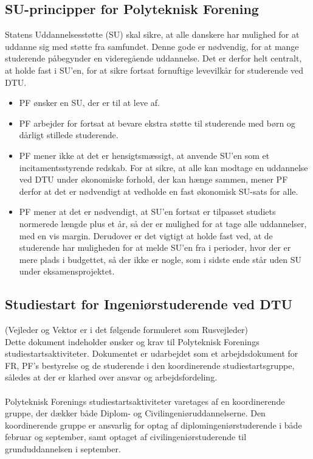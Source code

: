 \subsection{SU-principper for Polyteknisk Forening}
Statens Uddannelsesstøtte (SU) skal sikre, at alle danskere har mulighed for at uddanne sig med støtte fra samfundet. Denne gode er nødvendig, for at mange studerende påbegynder en videregående uddannelse. Det er derfor helt centralt, at holde fast i SU’en, for at sikre fortsat fornuftige levevilkår for studerende ved DTU.
\begin{itemize}
\item PF ønsker en SU, der er til at leve af.

\item PF arbejder for fortsat at bevare ekstra støtte til studerende med børn og dårligt stillede studerende.

\item PF mener ikke at det er hensigtsmæssigt, at anvende SU’en som et incitamentsstyrende redskab. For at sikre, at alle kan modtage en uddannelse ved DTU under økonomiske forhold, der kan hænge sammen, mener PF derfor at det er nødvendigt at vedholde en fast økonomisk SU-sats for alle.

\item PF mener at det er nødvendigt, at SU’en fortsat er tilpasset studiets normerede længde plus et år, så der er mulighed for at tage alle uddannelser, med en vis margin. Derudover er det vigtigt at holde fast ved, at de studerende har muligheden for at melde SU’en fra i perioder, hvor der er mere plads i budgettet, så der ikke er nogle, som i sidste ende står uden SU under eksamensprojektet.
\end{itemize}

\subsection{Studiestart for Ingeniørstuderende ved DTU}
(Vejleder og Vektor er i det følgende formuleret som Rusvejleder)\\
Dette dokument indeholder ønsker og krav til Polyteknisk Forenings studiestartsaktiviteter. Dokumentet er udarbejdet som et arbejdsdokument for FR, PF’s bestyrelse og de studerende i den koordinerende studiestartsgruppe, således at der er klarhed over ansvar og arbejdsfordeling.\\
\\
Polyteknisk Forenings studiestartsaktiviteter varetages af en koordinerende gruppe, der dækker både Diplom- og Civilingeniøruddannelserne. Den koordinerende gruppe er ansvarlig for optag af diplomingeniørstuderende i både februar og september, samt optaget af civilingeniørstuderende til grunduddannelsen i september.

